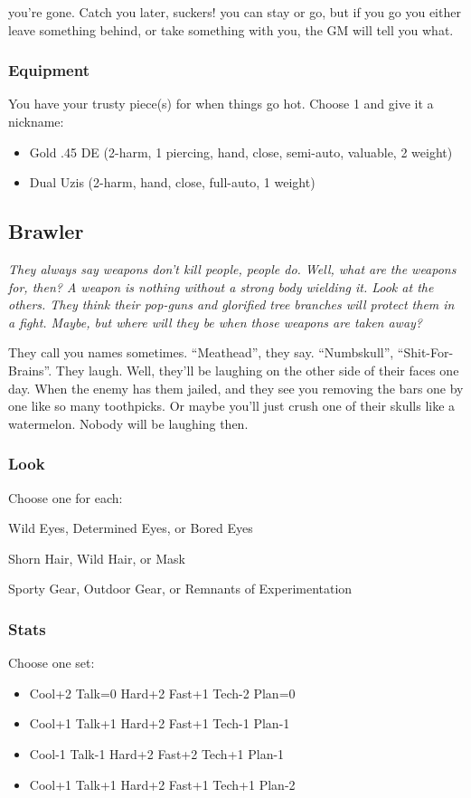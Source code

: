 {you're gone. Catch you later, suckers!}
{you can stay or go, but if you go you either leave something behind, or take something with you, the GM will tell you what.}

\subsubsection{Equipment}
You have your trusty piece(s) for when things go hot. Choose 1 and give it a nickname:
\begin{itemize}
\item Gold .45 DE (2-harm, 1 piercing, hand, close, semi-auto, valuable, 2 weight)
\item Dual Uzis (2-harm, hand, close, full-auto, 1 weight) 
\end{itemize}



\subsection{Brawler}
{\itshape They always say weapons don't kill people, people do. Well, what are the weapons for, then? A weapon is nothing without a strong body wielding it. Look at the others. They think their pop-guns and glorified tree branches will protect them in a fight. Maybe, but where will they be when those weapons are taken away?

They call you names sometimes. ``Meathead'', they say. ``Numbskull'', ``Shit-For-Brains''. They laugh. Well, they'll be laughing on the other side of their faces one day. When the enemy has them jailed, and they see you removing the bars one by one like so many toothpicks. Or maybe you'll just crush one of their skulls like a watermelon. Nobody will be laughing then.}

\subsubsection{Look}
Choose one for each:

Wild Eyes, Determined Eyes, or Bored Eyes

Shorn Hair, Wild Hair, or Mask

Sporty Gear, Outdoor Gear, or Remnants of Experimentation

\subsubsection{Stats}
Choose one set:
\begin{itemize}
\setlength\itemsep{0em}
\item Cool+2 Talk=0 Hard+2 Fast+1 Tech-2 Plan=0
\item Cool+1 Talk+1 Hard+2 Fast+1 Tech-1 Plan-1
\item Cool-1 Talk-1 Hard+2 Fast+2 Tech+1 Plan-1
\item Cool+1 Talk+1 Hard+2 Fast+1 Tech+1 Plan-2
\end{itemize}

